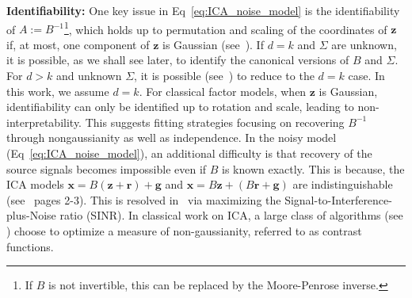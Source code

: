 \documentclass[letterpaper]{article}
\newcommand{\bg}{\pmb{g}}
\newcommand{\bz}{\pmb{z}}
\newcommand{\bk}{\color{black}}
\begin{document}
\textbf{Identifiability:} 
One key issue in Eq~\ref{eq:ICA_noise_model} is the identifiability of $A:=B^{-1}$\footnote{If $B$ is not invertible, this can be replaced by the Moore-Penrose inverse.}, which holds up to permutation and scaling of the coordinates of $\bz$ if, at most, one component of $\bz$ is Gaussian (see~\cite{darmois1953analyse,skitovitch1953property}). %
If $d=k$ and $\Sigma$ are unknown, it is possible, as we shall see later, to identify the canonical versions of $B$ and $\Sigma$. For $d>k$ and unknown $\Sigma$, it is possible (see~\cite{Davies2004identifiability}) to reduce to the $d=k$ case. In this work, we assume $d=k$. 
 For classical factor models, when $\bz$ is Gaussian, identifiability can only be identified up to rotation and scale, leading to non-interpretability.  This suggests fitting strategies focusing on recovering $B^{-1}$ through nongaussianity as well as independence. In the noisy model (Eq~\ref{eq:ICA_noise_model}), an additional difficulty is that recovery of the source signals becomes impossible even if $B$ is known exactly. This is because, the ICA models $\mathbf{x} = B(\mathbf{z} + \mathbf{r}) + \mathbf{g}$ and $\mathbf{x} = B\mathbf{z} + (B\mathbf{r} + \mathbf{g})$ are indistinguishable 
(see~\cite{DBLP:journals/corr/VossBR15} pages 2-3). This is resolved in~\cite{DBLP:journals/corr/VossBR15} via maximizing the Signal-to-Interference-plus-Noise ratio (SINR). In classical work on ICA, a large class of algorithms (see \cite{oja2000independent}) choose to optimize a measure of non-gaussianity, referred to as contrast functions.
\end{document}
